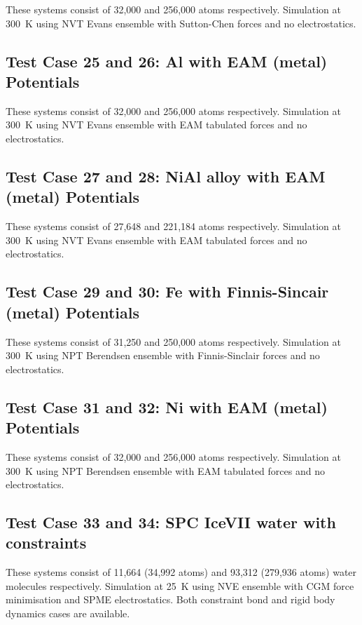 These systems consist of 32,000 and 256,000 atoms respectively.
Simulation at 300~K using NVT Evans ensemble with Sutton-Chen
forces and no electrostatics.

\subsection{Test Case 25 and 26: Al with EAM (metal) Potentials}

These systems consist of 32,000 and 256,000 atoms respectively.
Simulation at 300~K using NVT Evans ensemble with EAM tabulated
forces and no electrostatics.

\subsection{Test Case 27 and 28: NiAl alloy with EAM (metal) Potentials}

These systems consist of 27,648 and 221,184 atoms respectively.
Simulation at 300~K using NVT Evans ensemble with EAM tabulated
forces and no electrostatics.

\subsection{Test Case 29 and 30: Fe with Finnis-Sincair (metal) Potentials}

These systems consist of 31,250 and 250,000 atoms respectively.
Simulation at 300~K using NPT Berendsen ensemble with Finnis-Sinclair
forces and no electrostatics.

\subsection{Test Case 31 and 32: Ni with EAM (metal) Potentials}

These systems consist of 32,000 and 256,000 atoms respectively.
Simulation at 300~K using NPT Berendsen ensemble with EAM tabulated
forces and no electrostatics.

\subsection{Test Case 33 and 34: SPC IceVII water with constraints}

These systems consist of 11,664 (34,992 atoms) and 93,312 (279,936
atoms) water molecules respectively.  Simulation at 25~K using NVE
ensemble with CGM force minimisation and SPME electrostatics.  Both
constraint bond and rigid body dynamics cases are available.

